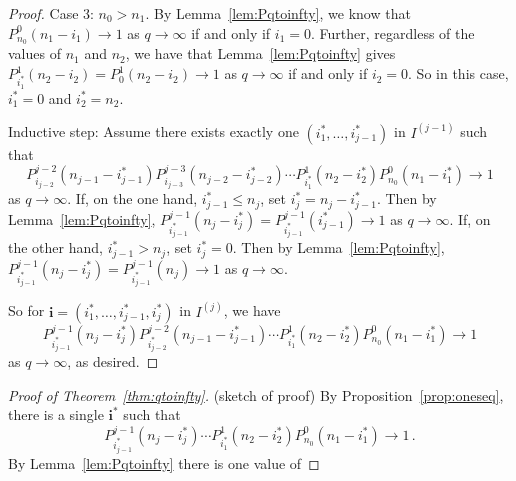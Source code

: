 \begin{proof}
Case 3: $n_0 > n_1$. By Lemma~\ref{lem:Pqtoinfty}, we know that $P_{n_0}^0
(n_1 - i_1) \to 1$ as $q\to\infty$ if and only if $i_1 = 0$. 
Further, regardless of the values of $n_1$ and $n_2$,
we have that Lemma~\ref{lem:Pqtoinfty} gives 
$P_{i_1^\ast}^1(n_2 - i_2) = P_{0}^1(n_2 - i_2)\to 1$ as $q\to\infty$ if and
only if $i_2 = 0$.  So in this case, $i_1^\ast = 0$ and $i_2^\ast = n_2$.

Inductive step: Assume there exists exactly one $(i_1^\ast,\ldots , i_{j-1}^\ast)$ in $I^{(j-1)}$ such that 
\[
P_{i_{j-2}}^{j-2}(n_{j-1} - i_{j-1}^\ast)P_{i_{j-3}}^{j-3}(n_{j-2} - i_{j-2}^\ast) \cdots P_{i_1^\ast}^1 (n_2 - i_2^\ast) P_{n_0}^0 (n_1 - i_1^\ast) \to 1
\]
as $q\to\infty$. If, on the one hand, $i_{j-1}^\ast \leq n_j$, set $i_j^\ast =
n_j-i_{j-1}^\ast$.  Then by Lemma~\ref{lem:Pqtoinfty},
$P_{i_{j-1}^\ast}^{j-1}(n_j - i_j^\ast) = P_{i_{j-1}^\ast}^{j-1}(i_{j-1}^\ast)
\to 1$ as $q\to\infty$. If, on the other hand, $i_{j-1}^\ast > n_j$, set
$i_j^\ast = 0$. Then by Lemma~\ref{lem:Pqtoinfty},
$P_{i_{j-1}^\ast}^{j-1}(n_j - i_j^\ast) = P_{i_{j-1}^\ast}^{j-1}(n_j ) \to 1$
as $q \to\infty$.  

So for $\mathbf{i} = (i_1^\ast,\ldots, i_{j-1}^\ast, i_j^\ast)$ in $I^{(j)}$, we have
\[
P_{i_{j-1}^\ast}^{j-1}(n_j-i_j^\ast)P_{i_{j-2}^\ast}^{j-2}(n_{j-1}-i_{j-1}^\ast)\cdots P_{i_1^\ast}^1(n_2-i_2^\ast)P_{n_0}^0(n_1-i_1^\ast) \to 1
\]
as $q\to\infty$, as desired.
\end{proof}

\begin{proof}[Proof of Theorem~\ref{thm:qtoinfty}]
  (sketch of proof) By Proposition~\ref{prop:oneseq}, there is a single $\mathbf{i}^*$
  such that
  \[
    P_{i_{j-1}^\ast}^{j-1}(n_j-i_j^\ast)\cdots
    P_{i_1^\ast}^1(n_2-i_2^\ast)P_{n_0}^0(n_1-i_1^\ast) \to 1 \, .
  \]
  By Lemma~\ref{lem:Pqtoinfty} there is one value of 
\end{proof}

